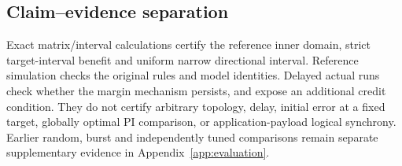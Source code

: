 \subsection{Claim--evidence separation}
Exact matrix/interval calculations certify the reference inner
domain, strict target-interval benefit and uniform narrow directional
interval. Reference simulation checks the original rules and model
identities. Delayed actual runs check whether the margin mechanism
persists, and expose an additional credit condition. They do not
certify arbitrary topology, delay, initial error at a fixed target,
globally optimal PI comparison, or application-payload logical
synchrony. Earlier random, burst and independently tuned comparisons
remain separate supplementary evidence in Appendix~\ref{app:evaluation}.
